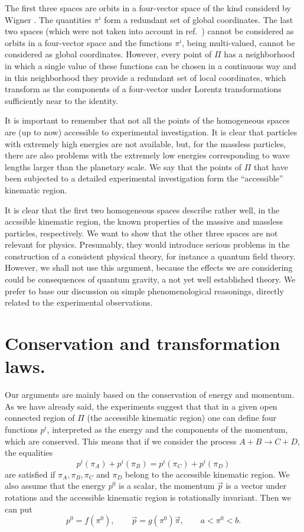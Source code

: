 \documentclass[a4paper,12pt]{article}
\begin{document}
The first three spaces are orbits in a four-vector space of the kind considerd by Wigner \cite {Wigner}. The quantities $\pi^i$ form a redundant set of global coordinates.  The last two spaces (which were not taken into account in ref.\ \cite{Toller}) cannot be considered as orbits in a four-vector space and the functions $\pi^i$, being multi-valued, cannot be considered as global coordinates. However, every point of $\Pi$ has a neighborhood in which a single value of these functions can be chosen in a continuous way and in this neighborhood they provide a redundant set of local coordinates, which transform as the components of a four-vector under Lorentz transformations sufficiently near to the identity.

It is important to remember that not all the points of the homogeneous spaces are (up to now) accessible to experimental investigation. It is clear that particles with extremely high energies are not available, but, for the massless particles, there are also problems with the extremely low energies corresponding to wave lengths larger than the planetary scale. We say that the points of $\Pi$ that have been subjected to a detailed experimental investigation form the ``accessible'' kinematic region.

It is clear that the first two homogeneous spaces describe rather well, in the accssible kinematic region, the known properties of the massive and massless particles, respectively. We want to show that the other three spaces are not relevant for physics. Presumably, they would introduce serious problems in the construction of a consistent physical theory, for instance a quantum field theory. However, we shall not use this argument, because the effects we are considering could be consequences of quantum gravity, a not yet well established theory. We prefer to base our discussion on simple phenomenological reasonings, directly related to the experimental observations.

\section{Conservation and transformation laws.}

Our arguments are mainly based on the conservation of energy and momentum. As we have already said, the experiments suggest that that in a given open connected region of $\Pi$ (the accessible kinematic region) one can define four functions $p^i$, interpreted as the energy and the components of the momentum, which are conserved. This means that if we consider the process $A + B \to C + D$, the equalities 
\begin{equation} \label{Cons}
p^i(\pi_A) + p^i(\pi_B) = p^i(\pi_C) + p^i(\pi_D)
\end{equation}
are satisfied if $\pi_A, \pi_B, \pi_C$ and $\pi_D$ belong to the accessible kinematic region. We also assume that the energy $p^0$ is a scalar, the momentum $\vec p$ is a vector under rotations and the accessible kinematic region is rotationally invariant. Then we can put
\begin{equation} \label{EnMom}
p^0 = f(\pi^0), \qquad  \vec p = g(\pi^0) \vec\pi, \qquad a < \pi^0 < b.
\end{equation}
\end{document}
